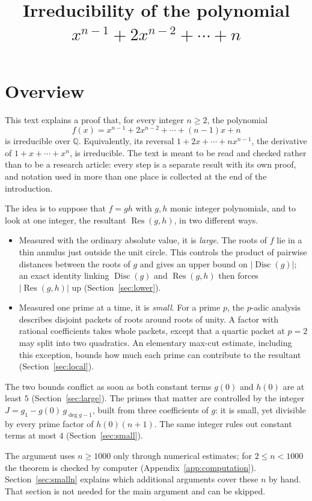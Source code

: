 \documentclass[11pt]{amsart}
\title[Irreducibility of $x^{n-1}+2x^{n-2}+\cdots+n$]
      {Irreducibility of the polynomial $x^{n-1}+2x^{n-2}+\cdots+n$}
\author{}
\date{}
\theoremstyle{definition}
\theoremstyle{remark}
\numberwithin{equation}{section}
\newcommand{\Q}{\mathbb{Q}}
\newcommand{\Disc}{\operatorname{Disc}}
\newcommand{\Res}{\operatorname{Res}}
\begin{document}
\maketitle

\section*{Overview}

This text explains a proof that, for every integer $n\ge2$, the polynomial
\[
 f(x)=x^{n-1}+2x^{n-2}+\cdots+(n-1)x+n
\]
is irreducible over $\Q$. Equivalently, its reversal
$1+2x+\cdots+nx^{n-1}$, the derivative of $1+x+\cdots+x^n$, is
irreducible. The text is meant to be read and checked rather than to be a
research article: every step is a separate result with its own proof, and
notation used in more than one place is collected at the end of the
introduction.

The idea is to suppose that $f=gh$ with $g,h$ monic integer polynomials, and
to look at one integer, the resultant $\Res(g,h)$, in two different ways.
\begin{itemize}
\item Measured with the ordinary absolute value, it is \emph{large}. The
 roots of $f$ lie in a thin annulus just outside the unit circle. This
 controls the product of pairwise distances between the roots of $g$ and
 gives an upper bound on $|\Disc(g)|$; an exact identity linking
 $\Disc(g)$ and $\Res(g,h)$ then forces $|\Res(g,h)|$ up
 (Section~\ref{sec:lower}).
\item Measured one prime at a time, it is \emph{small}. For a prime $p$,
 the $p$-adic analysis describes disjoint packets of roots around roots of
 unity. A factor with rational coefficients takes whole
 packets, except that a quartic packet at $p=2$ may split into two quadratics.
 An elementary max-cut estimate, including this exception, bounds how much
 each prime can contribute to the resultant (Section~\ref{sec:local}).
\end{itemize}
The two bounds conflict as soon as both constant terms $g(0)$ and $h(0)$ are
at least $5$ (Section~\ref{sec:large}). The primes that matter are
controlled by the integer $J=g_1-g(0)\,g_{\deg g-1}$, built from three
coefficients of $g$: it is small, yet divisible by every prime factor of
$h(0)(n+1)$. The same integer rules out constant terms at most $4$
(Section~\ref{sec:small}).

The argument uses $n\ge1000$ only through numerical estimates; for
$2\le n<1000$ the theorem is checked by computer
(Appendix~\ref{app:computation}). Section~\ref{sec:smalln} explains which
additional arguments cover these $n$ by hand. That section is not needed
for the main argument and can be skipped.
\end{document}
